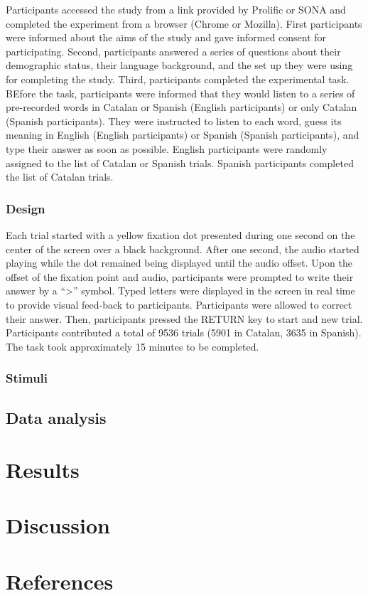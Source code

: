 \documentclass[english,man]{apa6}
\begin{document}
Participants accessed the study from a link provided by Prolific or SONA and completed the experiment from a browser (Chrome or Mozilla). First participants were informed about the aims of the study and gave informed consent for participating. Second, participants answered a series of questions about their demographic status, their language background, and the set up they were using for completing the study. Third, participants completed the experimental task. BEfore the task, participants were informed that they would listen to a series of pre-recorded words in Catalan or Spanish (English participants) or only Catalan (Spanish participants). They were instructed to listen to each word, guess its meaning in English (English participants) or Spanish (Spanish participants), and type their answer as soon as possible. English participants were randomly assigned to the list of Catalan or Spanish trials. Spanish participants completed the list of Catalan trials.

\hypertarget{design}{%
\subsubsection{Design}\label{design}}

Each trial started with a yellow fixation dot presented during one second on the center of the screen over a black background. After one second, the audio started playing while the dot remained being displayed until the audio offset. Upon the offset of the fixation point and audio, participants were prompted to write their answer by a \enquote{\textgreater{}} symbol. Typed letters were displayed in the screen in real time to provide visual feed-back to participants. Participants were allowed to correct their answer. Then, participants pressed the RETURN key to start and new trial. Participants contributed a total of 9536 trials (5901 in Catalan, 3635 in Spanish). The task took approximately 15 minutes to be completed.

\hypertarget{stimuli}{%
\subsubsection{Stimuli}\label{stimuli}}

\hypertarget{data-analysis}{%
\subsection{Data analysis}\label{data-analysis}}

\hypertarget{results}{%
\section{Results}\label{results}}

\hypertarget{discussion}{%
\section{Discussion}\label{discussion}}

\newpage

\hypertarget{references}{%
\section{References}\label{references}}

\begingroup
\setlength{\parindent}{-0.5in}
\setlength{\leftskip}{0.5in}

\hypertarget{refs}{}

\endgroup
\end{document}
